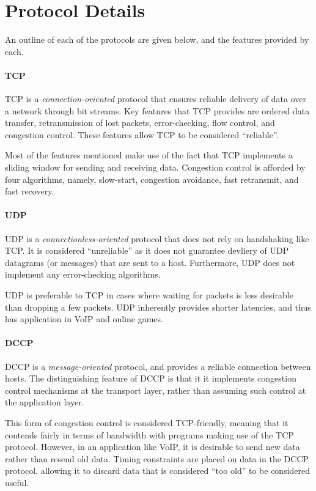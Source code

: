 \documentclass[10pt,a4paper]{article}
\begin{document}
\section{Protocol Details}
An outline of each of the protocols are given below, and the features provided by each. 

\paragraph{TCP}
TCP is a \emph{connection-oriented} protocol that ensures reliable delivery of data over a network through bit streams. Key features
that TCP provides are ordered data transfer, retransmission of lost packets, error-checking, flow control, and congestion control. 
These features allow TCP to be considered ``reliable''. 

Most of the features mentioned make use of the fact that TCP implements a sliding
window for sending and receiving data. Congestion control is afforded by four algorithms, namely, slow-start, congestion avoidance,
fast retransmit, and fast recovery. 

\paragraph{UDP}
UDP is a \emph{connectionless-oriented} protocol that does not rely on handshaking like TCP. It is considered ``unreliable'' as it 
does not guarantee devliery of UDP datagrams (or messages) that are sent to a host. Furthermore, UDP does not implement
any error-checking algorithms.

UDP is preferable to TCP in cases where waiting for packets is less desirable than dropping a few packets. UDP inherently provides
shorter latencies, and thus has application in VoIP and online games. 

\paragraph{DCCP}
DCCP is a \emph{message-oriented} protocol, and provides a reliable connection between hosts. 
The distinguishing feature of DCCP is that it it implements congestion control mechanisms at the transport layer,
 rather than assuming such control at the application layer.

This form of congestion control is considered TCP-friendly, meaning that it contends fairly in terms of bandwidth with programs making
use of the TCP protocol. However, in an application like VoIP, it is desirable to send new data rather than resend old data. Timing
constraints are placed on data in the DCCP protocol, allowing it to discard data that is considered ``too old'' to be considered
useful. 
\end{document}
